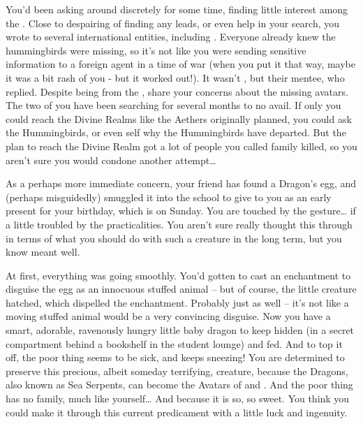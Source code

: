 \documentclass[char]{GL2020}
\begin{document}
You'd been asking around discretely for some time, finding little interest among the \pFarm{}. Close to despairing of finding any leads, or even help in your search, you wrote to several international entities, including \cHeadDiplomat{\full}. Everyone already knew the hummingbirds were missing, so it's not like you were sending sensitive information to a foreign agent in a time of war (when you put it that way, maybe it was a bit rash of you - but it worked out!). It wasn't \cHeadDiplomat{}, but their mentee, \cJuniorStatesman{\full} who replied. Despite being from the \pShip{}, \cJuniorStatesman{\they} share\cJuniorStatesman{\plural} your concerns about the missing avatars. The two of you have been searching for several months to no avail. If only you could reach the Divine Realms like the Aethers originally planned, you could  ask the Hummingbirds, or even \cFarmGod{} \cFarmGod{\them}self why the Hummingbirds have departed. But the plan to reach the Divine Realm got a lot of people you called family killed, so you aren't sure you would condone another attempt\ldots{}
 
As a perhaps more immediate concern, your friend \cPirateChild{} has found a Dragon's egg, and (perhaps misguidedly) smuggled it into the school to give to you as an early present for your birthday, which is on Sunday. You are touched by the gesture\ldots{} if a little troubled by the practicalities. You aren't sure \cPirateChild{} really thought this through in terms of what you should do with such a creature in the long term, but you know \cPirateChild{\they} meant well. 

At first, everything was going smoothly. You'd gotten \cAdopted{} to cast an enchantment to disguise the egg as an innocuous stuffed animal – but of course, the little creature hatched, which dispelled the enchantment. Probably just as well – it's not like a moving stuffed animal would be a very convincing disguise. Now you have a smart, adorable, ravenously hungry little baby dragon to keep hidden (in a secret compartment behind a bookshelf in the student lounge) and fed. And to top it off, the poor thing seems to be sick, and keeps sneezing! You are determined to preserve this precious, albeit someday terrifying, creature, because the Dragons, also known as Sea Serpents, can become the Avatars of \cEbbFull{\full} and \cFlowFull{\full}. And the poor thing has no family, much like yourself\ldots{} And because it is so, so sweet. You think you could make it through this current predicament with a little luck and ingenuity.
\end{document}
